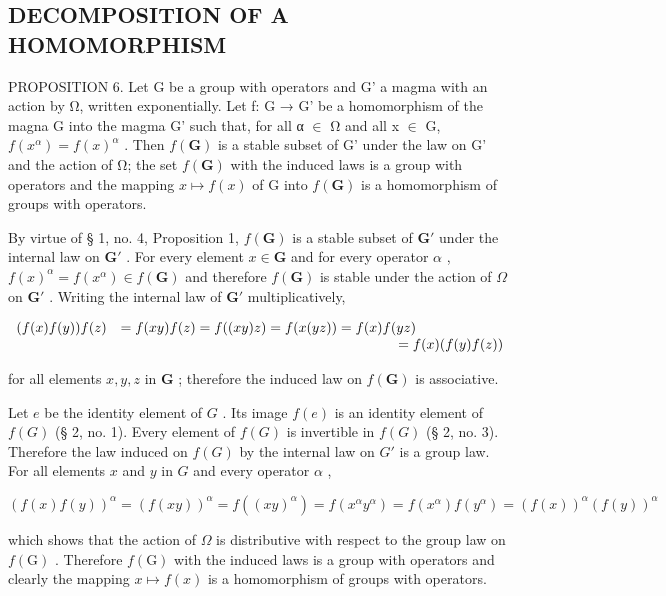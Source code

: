 \subsection{DECOMPOSITION OF A HOMOMORPHISM}

PROPOSITION 6. Let G be a group with operators and G' a magma with an action by Ω, written exponentially. Let f: G → G' be a homomorphism of the magna G into the magma G' such that, for all α \ensuremath{\in} Ω and all x \ensuremath{\in} G, \(f(x^{\alpha}) = f(x)^{\alpha}\) . Then \(f(\mathbf{G})\) is a stable subset of G' under the law on G' and the action of Ω; the set \(f(\mathbf{G})\) with the induced laws is a group with operators and the mapping \(x \mapsto f(x)\) of G into \(f(\mathbf{G})\) is a homomorphism of groups with operators.

By virtue of § 1, no. 4, Proposition 1, \(f(\mathbf{G})\) is a stable subset of \(\mathbf{G}'\) under the internal law on \(\mathbf{G}'\) . For every element \(x \in \mathbf{G}\) and for every operator \(\alpha\) , \(f(x)^{\alpha} = f(x^{\alpha}) \in f(\mathbf{G})\) and therefore \(f(\mathbf{G})\) is stable under the action of \(\Omega\) on \(\mathbf{G}'\) . Writing the internal law of \(\mathbf{G}'\) multiplicatively,

\[
\begin{array}{r l} (f (x) f (y)) f (z) & = f (x y) f (z) = f ((x y) z) = f (x (y z)) = f (x) f (y z) \\ & \qquad \qquad \qquad \qquad \qquad \qquad \qquad \qquad \qquad \qquad = f (x) (f (y) f (z)) \end{array}
\]

for all elements \(x, y, z\) in \(\mathbf{G}\) ; therefore the induced law on \(f(\mathbf{G})\) is associative.

Let \(e\) be the identity element of \(G\) . Its image \(f(e)\) is an identity element of \(f(G)\) (§ 2, no. 1). Every element of \(f(G)\) is invertible in \(f(G)\) (§ 2, no. 3). Therefore the law induced on \(f(G)\) by the internal law on \(G'\) is a group law. For all elements \(x\) and \(y\) in \(G\) and every operator \(\alpha\) ,

\[
(f (x) f (y)) ^ {\alpha} = (f (x y)) ^ {\alpha} = f ((x y) ^ {\alpha}) = f \left(x ^ {\alpha} y ^ {\alpha}\right) = f \left(x ^ {\alpha}\right) f \left(y ^ {\alpha}\right) = (f (x)) ^ {\alpha} (f (y)) ^ {\alpha}
\]

which shows that the action of \(\Omega\) is distributive with respect to the group law on \(f(\mathrm{G})\) . Therefore \(f(\mathrm{G})\) with the induced laws is a group with operators and clearly the mapping \(x \mapsto f(x)\) is a homomorphism of groups with operators.

